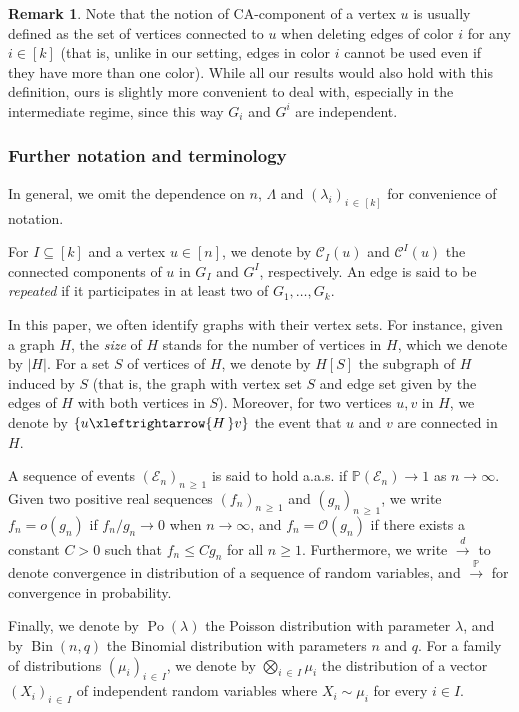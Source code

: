 \documentclass[10pt]{amsart}
\theoremstyle{definition}\newtheorem{defi}[theo]{Definition}\newtheorem{rema}[theo]{Remark}\newtheorem{exam}[theo]{Example}\newtheorem{exem}[theo]{Example}\newtheorem{nota}[theo]{Notation}
\renewcommand{\Pr}{\mathbb{P}}
\newcommand{\cO}{\mathcal{O}}
\newcommand{\cC}{\mathcal{C}}
\newcommand{\cE}{\mathcal{E}}
\DeclareMathOperator{\rPo}{Po}
\DeclareMathOperator{\rBin}{Bin}
\begin{document}
\begin{rema}
Note that the notion of CA-component of a vertex $u$ is usually defined as the set of vertices connected to $u$ when deleting edges of color $i$ for any $i\in [k]$ (that is, unlike in our setting, edges in color $i$ cannot be used even if they have more than one color). While all our results would also hold with this definition, ours is slightly more convenient to deal with, especially in the intermediate regime, since this way $G_i$ and $G^i$ are independent.
\end{rema}

\subsubsection*{Further notation and terminology}
In general, we omit the dependence on $n$, $\Lambda$ and $(\lambda_i)_{i\,\in\,[k]}$ for convenience of notation.


For $I\subseteq [k]$ and a vertex $u\in [n]$, we denote by $\cC_I(u)$ and $\cC^I(u)$ the connected components of $u$ in $G_I$ and $G^I$, respectively. An edge is said to be \emph{repeated} if it participates in at least two of $G_1, \ldots, G_k$.


In this paper, we often identify graphs with their vertex sets. For instance, given a graph $H$, the \emph{size} of $H$ stands for the number of vertices in $H$, which we denote by $|H|$. For a set $S$ of vertices of $H$, we denote by $H[S]$ the subgraph of $H$ induced by $S$ (that is, the graph with vertex set $S$ and edge set given by the edges of $H$ with both vertices in $S$). Moreover, for two vertices $u,v$ in $H$, we denote by $\{u\xleftrightarrow{H\,} v\}$ the event that $u$ and $v$ are connected in $H$.

A sequence of events $(\cE_n)_{n\,\ge\,1}$ is said to hold a.a.s. if $\Pr(\cE_n)\to 1$ as $n\to \infty$. Given two positive real sequences $(f_n)_{n\,\ge\,1}$ and $(g_n)_{n\,\ge\,1}$, we write $f_n=o(g_n)$ if $f_n/g_n\to 0$ when $n\to\infty$, and $f_n=\cO(g_n)$ if there exists a constant $C>0$ such that $f_n\le Cg_n$ for all $n\ge 1$. Furthermore, we write $\xrightarrow{d}$ to denote convergence in distribution of a sequence of random variables, and $\xrightarrow{\Pr}$ for convergence in probability.

Finally, we denote by $\rPo(\lambda)$ the Poisson distribution with parameter $\lambda$, and by $\rBin(n,q)$ the Binomial distribution with parameters $n$ and $q$. For a family of distributions $(\mu_i)_{i\,\in\,I}$, we denote by $\bigotimes_{i\,\in\,I} \mu_i$ the distribution of a vector $(X_i)_{i\,\in\,I}$ of independent random variables where $X_i\sim \mu_i$ for every $i\in I$.
\end{document}
